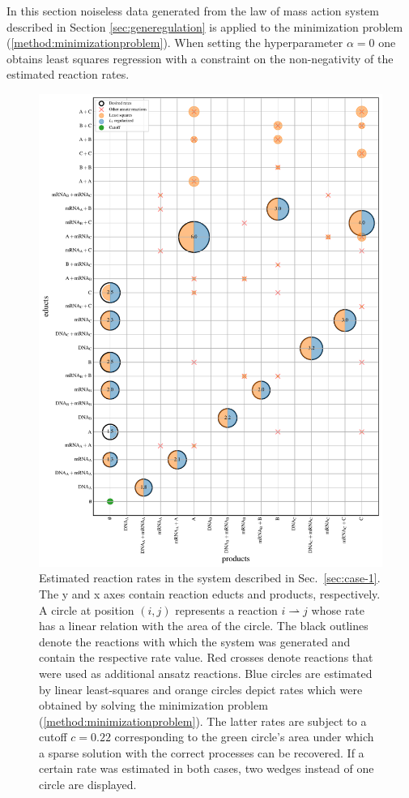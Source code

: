 \documentclass[oneside, abstracton, titlepage]{scrartcl}
\begin{document}
	In this section noiseless data generated from the law of mass action system described in Section \ref{sec:generegulation} is applied to the minimization problem (\ref{method:minimizationproblem}). When setting the hyperparameter $\alpha=0$ one obtains least squares regression with a constraint on the non-negativity of the estimated reaction rates.
	
	\begin{figure}
		\centering
		\includegraphics[width=.9\textwidth]{./figures_tex/sparsity_pattern}
		\caption{Estimated reaction rates in the system described in Sec.~\ref{sec:case-1}. The y and x axes contain reaction educts and products, respectively. A circle at position $(i,j)$ represents a reaction $i\rightharpoonup j$ whose rate has a linear relation with the area of the circle. The black outlines denote the reactions with which the system was generated and contain the respective rate value. Red crosses denote reactions that were used as additional ansatz reactions. Blue circles are estimated by linear least-squares and orange circles depict rates which were obtained by solving the minimization problem (\ref{method:minimizationproblem}). The latter rates are subject to a cutoff $c=0.22$ corresponding to the green circle's area under which a sparse solution with the correct processes can be recovered. If a certain rate was estimated in both cases, two wedges instead of one circle are displayed.}
		\label{fig:case-1-sparsity-pattern}
	\end{figure}
\end{document}
